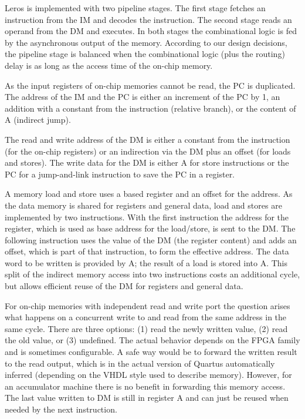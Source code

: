 \documentclass[a4paper,fontsize=10pt,twoside,DIV15,BCOR12mm,headinclude=true,footinclude=false,pagesize,bibtotoc]{scrbook}
\begin{document}
Leros is implemented with two pipeline stages. The first stage fetches an instruction from the IM and decodes the instruction. The second stage reads an operand from the DM and executes. In both stages the combinational logic is fed by the asynchronous output of the memory. According to our design decisions, the pipeline stage is balanced when the combinational logic (plus the routing) delay is as long as the access time of the on-chip memory.

As the input registers of on-chip memories cannot be read, the PC is duplicated. The address of the IM and the PC is either an increment of the PC by 1, an addition with a constant from the instruction (relative branch), or the content of A (indirect jump).

The read and write address of the DM is either a constant from the instruction (for the on-chip registers) or an indirection via the DM plus an offset (for loads and stores). The write data for the DM is either A for store instructions or the PC for a jump-and-link instruction to save the PC in a register.

A memory load and store uses a based register and an offset for the address. As the data memory is shared for registers and general data, load and stores are implemented by two instructions. With the first instruction the address for the register, which is used as base address for the load/store, is sent to the DM. The following instruction uses the value of the DM (the register content) and adds an offset, which is part of that instruction, to form the effective address. The data word to be written is provided by A; the result of a load is stored into A. This split of the indirect memory access into two instructions costs an additional cycle, but allows efficient reuse of the DM for registers and general data.

For on-chip memories with independent read and write port the question arises what happens on a concurrent write to and read from the same address in the same cycle. There are three options: (1) read the newly written value, (2) read the old value, or (3) undefined. The actual behavior depends on the FPGA family and is sometimes configurable. A safe way would be to forward the written result to the read output, which is in the actual version of Quartus automatically inferred (depending on the VHDL style used to describe memory). However, for an accumulator machine there is no benefit in forwarding this memory access. The last value written to DM is still in register A and can just be reused when needed by the next instruction.
\end{document}
